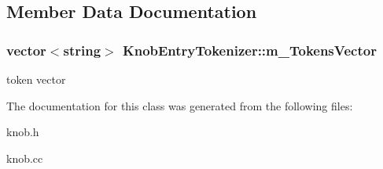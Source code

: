 \subsection{Member Data Documentation}
\hypertarget{classKnobEntryTokenizer_a62122ee60a897f0b14c1c10aebef4045}{
\subsubsection[{m\_\-TokensVector}]{\setlength{\rightskip}{0pt plus 5cm}vector$<$string$>$ {\bf KnobEntryTokenizer::m\_\-TokensVector}}}
\label{classKnobEntryTokenizer_a62122ee60a897f0b14c1c10aebef4045}
token vector 

The documentation for this class was generated from the following files:\begin{DoxyCompactItemize}
\item 
knob.h\item 
knob.cc\end{DoxyCompactItemize}
